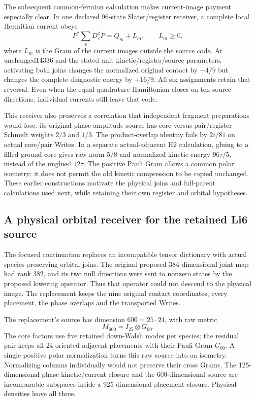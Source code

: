 The subsequent common-fermion calculation makes current-image payment
especially clear. In one declared 96-state Slater/register receiver, a
complete local Hermitian current obeys
\begin{equation}
P^*\sum_vD_v^2P=Q_m+L_m,\qquad L_m\geq0,
\end{equation}
where $L_m$ is the Gram of the current images outside the source code.
At unchanged14336 and the stated unit kinetic/register/source parameters,
activating both joins changes the normalized original contact by $-4/9$
but changes the complete diagnostic energy by $+16/9$. All six assignments
retain that reversal. Even when the equal-quadrature Hamiltonian closes on
ten source directions, individual currents still leave that code.

This receiver also preserves a correlation that independent fragment
preparations would lose: its original phase-amplitude source has core versus
pair/register Schmidt weights $2/3$ and $1/3$. The product-overlap identity
fails by $2i/81$ on actual core/pair Writes. In a separate actual-adjacent
H2 calculation, gluing to a filled ground core gives raw norm $5/8$ and
normalized kinetic energy $96\tau/5$, instead of the unglued $12\tau$.
The positive Pauli Gram allows a common polar isometry; it does not permit
the old kinetic compression to be copied unchanged. These earlier
constructions motivate the physical joins and full-parent calculations
used next, while retaining their own register and orbital hypotheses.

\subsection{A physical orbital receiver for the retained Li6 source}
\label{sec:physical600}

The focused continuation replaces an incompatible tensor dictionary with
actual species-preserving orbital joins. The original proposed
384-dimensional joint map had rank 382, and its two null directions were
sent to nonzero states by the proposed lowering operator. Thus that operator
could not descend to the physical image. The replacement keeps the nine
original contact coordinates, every placement, the phase overlaps and the
transported Writes.

The replacement's source has dimension $600=25\cdot24$, with raw metric
\begin{equation}
M_{600}=I_{25}\otimes G_{00}.
\end{equation}
The core factors use five retained down-Walsh modes per species; the residual
pair keeps all 24 oriented adjacent placements with their Pauli Gram
$G_{00}$. A single positive polar normalization turns this raw source into
an isometry. Normalizing columns individually would not preserve their
cross Grams. The 125-dimensional phase kinetic/current closure and the
600-dimensional source are incomparable subspaces inside a 925-dimensional
placement closure. Physical densities leave all three.

